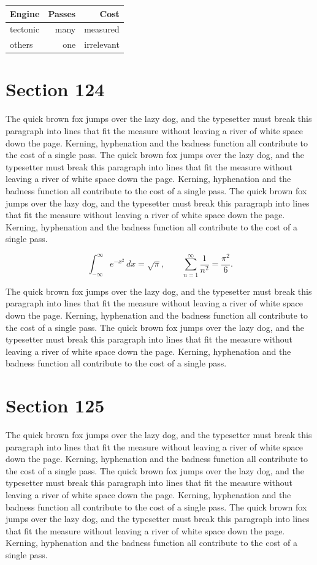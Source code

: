 \documentclass{article}
\begin{document}
\begin{center}
\begin{tabular}{lrr}
\toprule
Engine & Passes & Cost \\
\midrule
tectonic & many & measured \\
others & one & irrelevant \\
\bottomrule
\end{tabular}
\end{center}

\section{Section 124}
The quick brown fox jumps over the lazy dog, and the typesetter must break this paragraph into lines that fit the measure without leaving a river of white space down the page. Kerning, hyphenation and the badness function all contribute to the cost of a single pass. The quick brown fox jumps over the lazy dog, and the typesetter must break this paragraph into lines that fit the measure without leaving a river of white space down the page. Kerning, hyphenation and the badness function all contribute to the cost of a single pass. The quick brown fox jumps over the lazy dog, and the typesetter must break this paragraph into lines that fit the measure without leaving a river of white space down the page. Kerning, hyphenation and the badness function all contribute to the cost of a single pass. 

\begin{equation}
\int_{-\infty}^{\infty} e^{-x^{2}}\,dx = \sqrt{\pi}, \qquad
\sum_{n=1}^{\infty} \frac{1}{n^{2}} = \frac{\pi^{2}}{6}.
\end{equation}

The quick brown fox jumps over the lazy dog, and the typesetter must break this paragraph into lines that fit the measure without leaving a river of white space down the page. Kerning, hyphenation and the badness function all contribute to the cost of a single pass. The quick brown fox jumps over the lazy dog, and the typesetter must break this paragraph into lines that fit the measure without leaving a river of white space down the page. Kerning, hyphenation and the badness function all contribute to the cost of a single pass. 
\section{Section 125}
The quick brown fox jumps over the lazy dog, and the typesetter must break this paragraph into lines that fit the measure without leaving a river of white space down the page. Kerning, hyphenation and the badness function all contribute to the cost of a single pass. The quick brown fox jumps over the lazy dog, and the typesetter must break this paragraph into lines that fit the measure without leaving a river of white space down the page. Kerning, hyphenation and the badness function all contribute to the cost of a single pass. The quick brown fox jumps over the lazy dog, and the typesetter must break this paragraph into lines that fit the measure without leaving a river of white space down the page. Kerning, hyphenation and the badness function all contribute to the cost of a single pass. 
\end{document}

